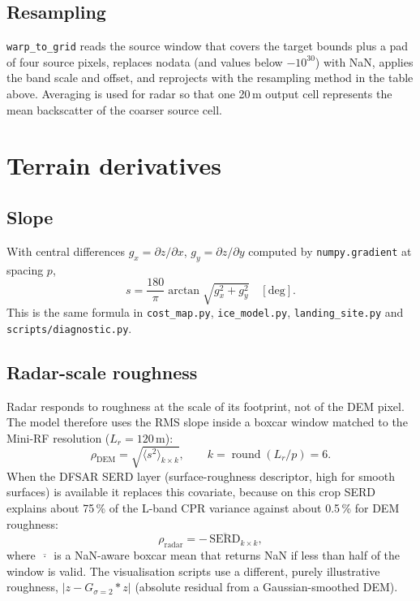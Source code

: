 \documentclass[11pt,a4paper]{article}
\newcommand{\code}[1]{\texttt{#1}}
\begin{document}
\subsection{Resampling}
\code{warp\_to\_grid} reads the source window that covers the target bounds plus a pad of four
source pixels, replaces nodata (and values below $-10^{30}$) with NaN, applies the band scale and
offset, and reprojects with the resampling method in the table above. Averaging is used for
radar so that one 20\,m output cell represents the mean backscatter of the coarser source cell.

\section{Terrain derivatives}

\subsection{Slope}
With central differences $g_x=\partial z/\partial x$, $g_y=\partial z/\partial y$ computed by
\code{numpy.gradient} at spacing $p$,
\begin{equation}
  s = \frac{180}{\pi}\arctan\sqrt{g_x^2+g_y^2}\quad[\text{deg}].
\end{equation}
This is the same formula in \code{cost\_map.py}, \code{ice\_model.py}, \code{landing\_site.py}
and \code{scripts/diagnostic.py}.

\subsection{Radar-scale roughness}
Radar responds to roughness at the scale of its footprint, not of the DEM pixel. The model
therefore uses the RMS slope inside a boxcar window matched to the Mini-RF resolution
($L_r=120$\,m):
\begin{equation}
  \rho_{\mathrm{DEM}} = \sqrt{\big\langle s^2\big\rangle_{k\times k}},\qquad
  k=\operatorname{round}(L_r/p)=6 .
\end{equation}
When the DFSAR SERD layer (surface-roughness descriptor, high for smooth surfaces) is
available it replaces this covariate, because on this crop SERD explains about 75\,\% of the
L-band CPR variance against about 0.5\,\% for DEM roughness:
\begin{equation}
  \rho_{\mathrm{radar}} = -\,\overline{\mathrm{SERD}}_{k\times k},
\end{equation}
where $\overline{\,\cdot\,}$ is a NaN-aware boxcar mean that returns NaN if less than half of the
window is valid. The visualisation scripts use a different, purely illustrative roughness,
$|z-G_{\sigma=2}*z|$ (absolute residual from a Gaussian-smoothed DEM).
\end{document}

